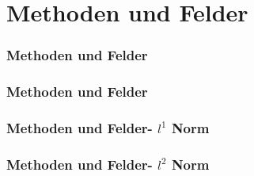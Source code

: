 \def\stitle{Methoden und Felder}
\section{\stitle}
\begin{frame}
  \frametitle{\stitle}%
\tableofcontents[current]
\end{frame}


\begin{frame}[t]%
    \frametitle{\stitle}


\end{frame}


\begin{frame}[t]%
    \frametitle{\stitle - $l^1$ Norm}


\end{frame}


\begin{frame}[t]%
    \frametitle{\stitle - $l^2$ Norm}


\end{frame}
